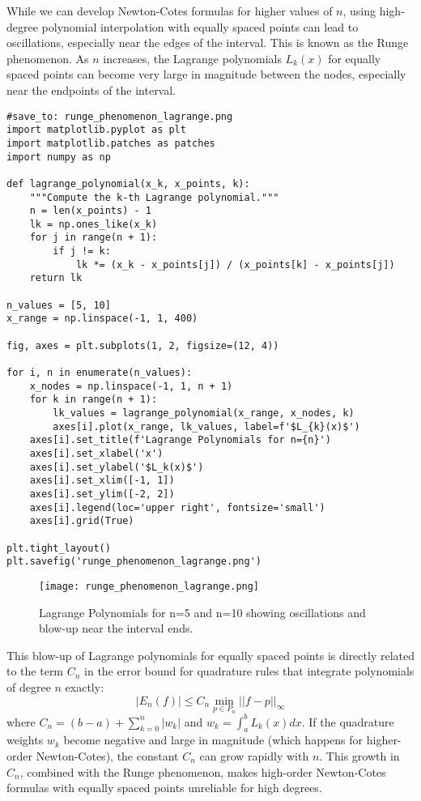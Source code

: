\documentclass{article}
\begin{document}
While we can develop Newton-Cotes formulas for higher values of $n$, using high-degree polynomial interpolation with equally spaced points can lead to oscillations, especially near the edges of the interval. This is known as the Runge phenomenon. As $n$ increases, the Lagrange polynomials $L_k(x)$ for equally spaced points can become very large in magnitude between the nodes, especially near the endpoints of the interval.

\begin{verbatim}
#save_to: runge_phenomenon_lagrange.png
import matplotlib.pyplot as plt
import matplotlib.patches as patches
import numpy as np

def lagrange_polynomial(x_k, x_points, k):
    """Compute the k-th Lagrange polynomial."""
    n = len(x_points) - 1
    lk = np.ones_like(x_k)
    for j in range(n + 1):
        if j != k:
            lk *= (x_k - x_points[j]) / (x_points[k] - x_points[j])
    return lk

n_values = [5, 10]
x_range = np.linspace(-1, 1, 400)

fig, axes = plt.subplots(1, 2, figsize=(12, 4))

for i, n in enumerate(n_values):
    x_nodes = np.linspace(-1, 1, n + 1)
    for k in range(n + 1):
        lk_values = lagrange_polynomial(x_range, x_nodes, k)
        axes[i].plot(x_range, lk_values, label=f'$L_{k}(x)$')
    axes[i].set_title(f'Lagrange Polynomials for n={n}')
    axes[i].set_xlabel('x')
    axes[i].set_ylabel('$L_k(x)$')
    axes[i].set_xlim([-1, 1])
    axes[i].set_ylim([-2, 2])
    axes[i].legend(loc='upper right', fontsize='small')
    axes[i].grid(True)

plt.tight_layout()
plt.savefig('runge_phenomenon_lagrange.png')
\end{verbatim}

\begin{figure}[h]
    \centering
    \texttt{[image: runge\_phenomenon\_lagrange.png]}
    \caption{Lagrange Polynomials for n=5 and n=10 showing oscillations and blow-up near the interval ends.}
    \label{fig:runge_phenomenon_lagrange}
\end{figure}

This blow-up of Lagrange polynomials for equally spaced points is directly related to the term $C_n$ in the error bound for quadrature rules that integrate polynomials of degree $n$ exactly:
\[
|E_n(f)| \leq C_n \min_{p \in P_n} ||f - p||_\infty
\]
where $C_n = (b-a) + \sum_{k=0}^n |w_k|$ and $w_k = \int_a^b L_k(x) dx$.
If the quadrature weights $w_k$ become negative and large in magnitude (which happens for higher-order Newton-Cotes), the constant $C_n$ can grow rapidly with $n$. This growth in $C_n$, combined with the Runge phenomenon, makes high-order Newton-Cotes formulas with equally spaced points unreliable for high degrees.
\end{document}
